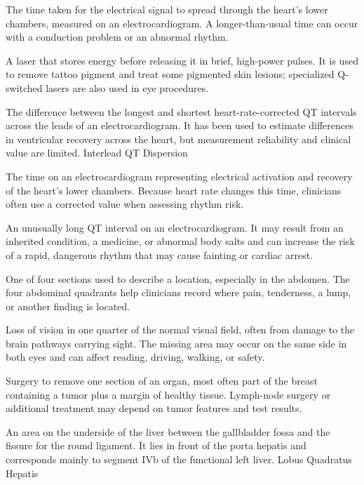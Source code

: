  The time taken for the electrical signal to spread through the heart’s lower chambers, measured on an electrocardiogram. A longer-than-usual time can occur with a conduction problem or an abnormal rhythm.

 A laser that stores energy before releasing it in brief, high-power pulses. It is used to remove tattoo pigment and treat some pigmented skin lesions; specialized Q-switched lasers are also used in eye procedures.

 The difference between the longest and shortest heart-rate-corrected QT intervals across the leads of an electrocardiogram. It has been used to estimate differences in ventricular recovery across the heart, but measurement reliability and clinical value are limited.
\synonyms
Interlead QT Dispersion

 The time on an electrocardiogram representing electrical activation and recovery of the heart's lower chambers. Because heart rate changes this time, clinicians often use a corrected value when assessing rhythm risk.

 An unusually long QT interval on an electrocardiogram. It may result from an inherited condition, a medicine, or abnormal body salts and can increase the risk of a rapid, dangerous rhythm that may cause fainting or cardiac arrest.

 One of four sections used to describe a location, especially in the abdomen. The four abdominal quadrants help clinicians record where pain, tenderness, a lump, or another finding is located.

 Loss of vision in one quarter of the normal visual field, often from damage to the brain pathways carrying sight. The missing area may occur on the same side in both eyes and can affect reading, driving, walking, or safety.

 Surgery to remove one section of an organ, most often part of the breast containing a tumor plus a margin of healthy tissue. Lymph-node surgery or additional treatment may depend on tumor features and test results.

 An area on the underside of the liver between the gallbladder fossa and the fissure for the round ligament. It lies in front of the porta hepatis and corresponds mainly to segment IVb of the functional left liver.
\synonyms
Lobus Quadratus Hepatis

